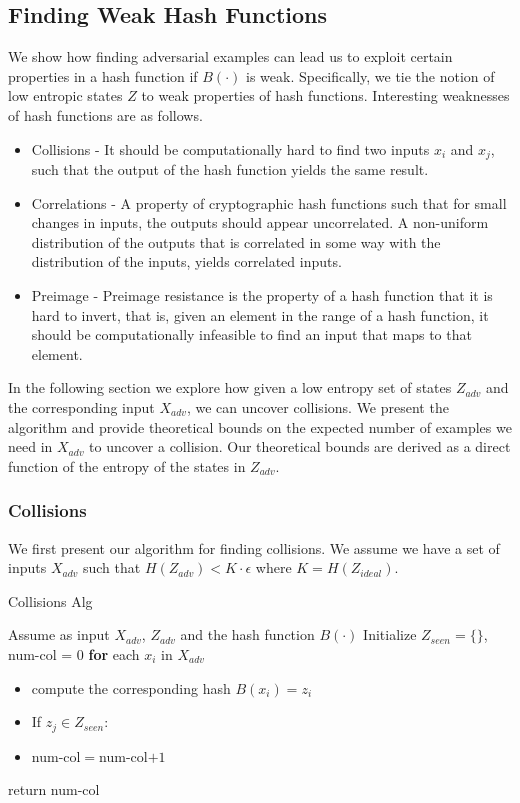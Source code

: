 \documentclass[letterpaper,twocolumn,10pt]{article}
\begin{document}
\subsection{Finding Weak Hash Functions}
We show how finding adversarial examples can lead us to exploit certain properties in a hash function if $B(\cdot)$ is weak. Specifically, we tie the notion of low entropic states $Z$ to weak properties of hash functions. Interesting weaknesses of hash functions are as follows.

\begin{itemize}
\item Collisions - It should be computationally hard to find two inputs $x_{i}$ and $x_{j}$, such that the output of the hash function yields the same result.
\item Correlations - A property of cryptographic hash functions such that for small changes in inputs, the outputs should appear uncorrelated. A non-uniform distribution of the outputs that is correlated in some way with the distribution of the inputs, yields correlated inputs. 
\item Preimage - Preimage resistance is the property of a hash function that it is hard to invert, that is, given an element in the range of a hash function, it should be computationally infeasible to find an input that maps to that element.
\end{itemize}

In the following section we explore how given a low entropy set of states $Z_{adv}$ and the corresponding input $X_{adv}$, we can uncover collisions. We present the algorithm and provide theoretical bounds on the expected number of examples we need in $X_{adv}$ to uncover a collision. Our theoretical bounds are derived as a direct function of the entropy of the states in $Z_{adv}$.  


\subsubsection{Collisions}
We first present our algorithm for finding collisions. We assume we have a set of inputs $X_{adv}$ such that $H(Z_{adv}) < K \cdot \epsilon$ where $K = H(Z_{ideal})$.

\begin{algorithm} \label{alg:col}
\caption{Collisions Alg}
\begin{algorithmic}[1]
\State Assume as input $X_{adv}$, $Z_{adv}$ and the hash function $B(\cdot)$
\State Initialize $Z_{seen} = \{\}$, num-col = 0
\State \textbf{for} each $x_{i}$ in $X_{adv}$
\begin{itemize}
\item compute the corresponding hash $B(x_{i}) = z_{i}$
\item If $z_{j} \in Z_{seen}$:
\item  num-col$=$num-col$ + 1$
\end{itemize}
\item return num-col
\end{algorithmic}
\end{algorithm}
\end{document}
